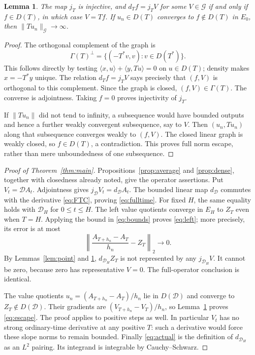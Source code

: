 \documentclass[11pt]{article}
\newtheorem{lemma}[theorem]{Lemma}
\newcommand{\D}{\mathcal D}\newcommand{\G}{\mathcal G}
\begin{document}
\begin{lemma}\label{lem:representation}
The map $j_T$ is injective, and $d_Tf=j_TV$ for some $V\in\G$ if and
only if $f\in D(T)$, in which case $V=Tf$. If
$u_n\in D(T)$ converges to $f\notin D(T)$ in $E_0$, then
$\|Tu_n\|_{\G}\to\infty$.
\end{lemma}
\begin{proof}
The orthogonal complement of the graph is
\[
 \Gamma(T)^\perp=\{(-T^*v,v):v\in D(T^*)\}.
\]
This follows directly by testing
$\langle x,u\rangle+\langle y,Tu\rangle=0$ on $u\in D(T)$;
density makes $x=-T^*y$ unique. The relation $d_Tf=j_TV$ says precisely
that $(f,V)$ is orthogonal to this complement. Since the graph is
closed, $(f,V)\in\Gamma(T)$. The converse is adjointness. Taking
$f=0$ proves injectivity of $j_T$.

If $\|Tu_n\|$ did not tend to infinity, a subsequence would have bounded
outputs and hence a further weakly convergent subsequence, say to $V$.
Then $(u_n,Tu_n)$ along that subsequence converges weakly to $(f,V)$.
The closed linear graph is weakly closed, so $f\in D(T)$,
a contradiction. This proves full norm escape, rather than mere
unboundedness of one subsequence.
\end{proof}

\begin{proof}[Proof of Theorem~\ref{thm:main}]
Propositions~\ref{prop:average} and \ref{prop:dense}, together with
closedness already noted, give the operator assertions. Put
$V_t=\D A_t$. Adjointness gives $j_{\D}V_t=d_{\D}A_t$. The bounded
linear map $d_{\D}$ commutes with the derivative \eqref{eq:FTC}, proving
\eqref{eq:fulltime}. For fixed $H$, the same equality holds with
$\D_H$ for $0\leq t\leq H$. The left value quotients converge in
$E_H$ to $Z_T$ even when $T=H$. Applying the bound in
\eqref{eq:bounds} proves \eqref{eq:left}; more precisely, its error is
at most
\[
 \left\|\frac{A_{T+h_n}-A_T}{h_n}-Z_T\right\|_2\longrightarrow0.
\]
By Lemmas~\ref{lem:point} and \ref{lem:representation},
$d_{\D_H}Z_T$ is not represented by any $j_{\D_H}V$. It cannot be
zero, because zero has representative $V=0$. The full-operator
conclusion is identical.

The value quotients
$u_n=(A_{T+h_n}-A_T)/h_n$ lie in $D(\D)$ and converge to
$Z_T\notin D(\D)$. Their gradients are
$(V_{T+h_n}-V_T)/h_n$, so Lemma~\ref{lem:representation} proves
\eqref{eq:escape}. The proof applies to positive steps as well.
In particular $V_t$ has no strong ordinary-time derivative at any
positive $T$: such a derivative would force these slope norms to remain
bounded. Finally \eqref{eq:actual} is the definition of $d_{\D_H}$
as an $L^2$ pairing. Its integrand is integrable by Cauchy--Schwarz.
\end{proof}
\end{document}

